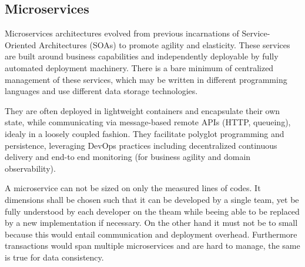 \documentclass[../Main.tex]{subfiles}
\begin{document}
\subsection{Microservices}
Microservices architectures evolved from previous incarnations of Service-Oriented 
Architectures (SOAs) to promote agility and elasticity.
These services are built around business 
capabilities and independently deployable by fully automated deployment machinery.
There is a bare minimum of centralized management of these services, which may be written in
different programming languages and use different data storage technologies.

They are often deployed in lightweight containers 
and encapsulate their own state, while communicating via message-based remote APIs
 (HTTP, queueing), idealy in a loosely coupled fashion.
They facilitate polyglot programming and persistence, leveraging DevOps practices including decentralized continuous delivery and end-to
end monitoring (for business agility and domain observability).


A microservice can not be sized on only the measured lines of codes.
It dimensions shall be chosen such that it can be developed by a single team, yet be
fully understood by each developer on the theam while beeing able to be replaced by a new implementation if necessary.
On the other hand it must not be to small because this would entail communication and deployment overhead.
Furthermore transactions would span multiple microservices and are hard to manage, the same is true for data consistency.
\end{document}
